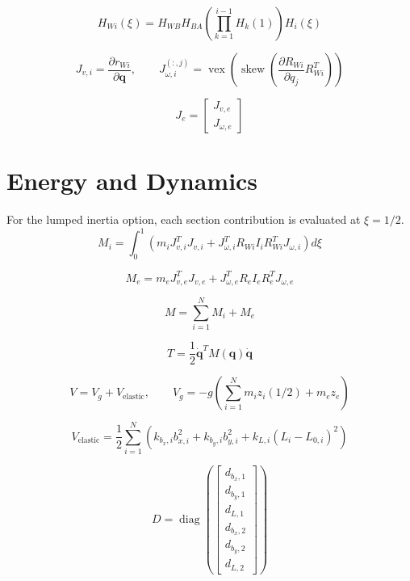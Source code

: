 \documentclass[11pt]{article}
\begin{document}
\begin{equation}
H_{Wi}(\xi)=H_{WB}H_{BA}\left(\prod_{k=1}^{i-1}H_k(1)\right)H_i(\xi)
\end{equation}

\begin{equation}
J_{v,i}=\frac{\partial r_{Wi}}{\partial\boldsymbol q},\qquad J_{\omega,i}^{(:,j)}=\operatorname{vex}\!\left(\operatorname{skew}\!\left(\frac{\partial R_{Wi}}{\partial q_j}R_{Wi}^{T}\right)\right)
\end{equation}

\begin{equation}
J_e=\begin{bmatrix}J_{v,e}\\J_{\omega,e}\end{bmatrix}
\end{equation}


\section{Energy and Dynamics}
For the lumped inertia option, each section contribution is evaluated at $\xi=1/2$.
\begin{equation}
M_i=\int_0^1\!\left(m_iJ_{v,i}^{T}J_{v,i}+J_{\omega,i}^{T}R_{Wi}I_iR_{Wi}^{T}J_{\omega,i}\right)d\xi
\end{equation}

\begin{equation}
M_e=m_eJ_{v,e}^{T}J_{v,e}+J_{\omega,e}^{T}R_eI_eR_e^TJ_{\omega,e}
\end{equation}

\begin{equation}
M=\sum_{i=1}^{N}M_i+M_e\label{eq:mass-assembly}
\end{equation}

\begin{equation}
T=\frac12\dot{\boldsymbol q}^{T}M(\boldsymbol q)\dot{\boldsymbol q}
\end{equation}

\begin{equation}
V=V_g+V_{\mathrm{elastic}},\qquad V_g=-g\!\left(\sum_{i=1}^{N}m_i z_i(1/2)+m_ez_e\right)
\end{equation}

\begin{equation}
V_{\mathrm{elastic}}=\frac12\sum_{i=1}^{N}\left(k_{b_x,i}b_{x,i}^{2}+k_{b_y,i}b_{y,i}^{2}+k_{L,i}(L_i-L_{0,i})^2\right)
\end{equation}

\begin{equation}
D=\operatorname{diag}\!\left(\begin{bmatrix}d_{b_x,1}\\d_{b_y,1}\\d_{L,1}\\d_{b_x,2}\\d_{b_y,2}\\d_{L,2}\end{bmatrix}\right)
\end{equation}
\end{document}
